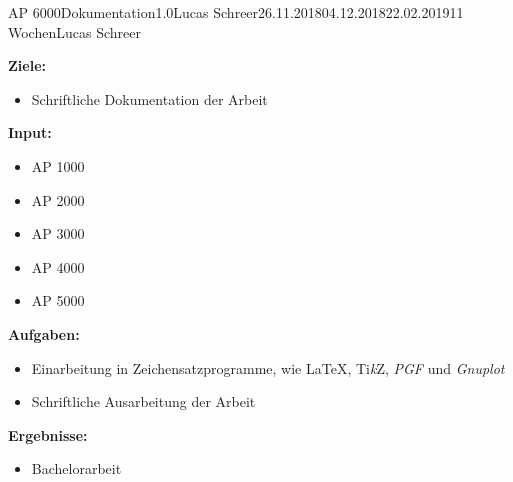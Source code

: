 \begin{appendix}


\clearpage
\begin{wpd}{AP 6000}{Dokumentation}{1.0}{Lucas Schreer}{26.11.2018}{04.12.2018}{22.02.2019}{11 Wochen}{Lucas Schreer}
    {
    \textbf{Ziele:}
    \begin{itemize}
        \item Schriftliche Dokumentation der Arbeit
    \end{itemize}
    \textbf{Input:}
    \begin{itemize}
        \item AP 1000
        \item AP 2000
        \item AP 3000
        \item AP 4000
        \item AP 5000
    \end{itemize}
    \textbf{Aufgaben:}
    \begin{itemize}
        \item Einarbeitung in Zeichensatzprogramme, wie \LaTeX, {Ti{\em k}Z}, \emph{PGF} und \emph{Gnuplot}
        \item Schriftliche Ausarbeitung der Arbeit
    \end{itemize}
    \textbf{Ergebnisse:}
    \begin{itemize}
        \item Bachelorarbeit
    \end{itemize}
    }
\end{wpd}

\end{appendix}
